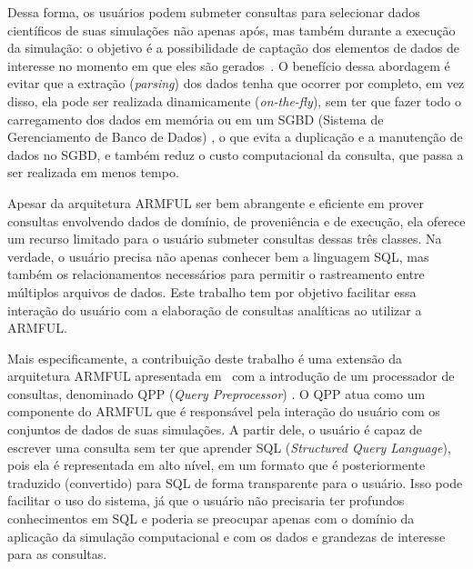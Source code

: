 Dessa forma, os usuários podem submeter consultas para selecionar dados científicos de suas simulações não apenas após, mas também durante a execução da simulação: o objetivo é a possibilidade de captação dos elementos de dados de interesse no momento em que eles são gerados~\cite{silva2015analyzing}. O benefício dessa abordagem é evitar que a extração (\textit{parsing}) dos dados tenha que ocorrer por completo, em vez disso, ela pode ser realizada dinamicamente (\textit{on-the-fly}), sem ter que fazer todo o carregamento dos dados em memória ou em um SGBD (Sistema de Gerenciamento de Banco de Dados) , o que evita a duplicação e a manutenção de dados no SGBD, e também reduz o custo computacional da consulta, que passa a ser realizada em menos tempo.

Apesar da arquitetura ARMFUL ser bem abrangente e eficiente em prover consultas envolvendo dados de domínio, de proveniência e de execução, ela oferece um recurso limitado para o usuário submeter consultas dessas três classes. Na verdade, o usuário precisa não apenas conhecer bem a linguagem SQL, mas também os relacionamentos necessários para permitir o rastreamento entre múltiplos arquivos de dados.
Este trabalho tem por objetivo facilitar essa interação do usuário com a elaboração de consultas analíticas ao utilizar a ARMFUL.

Mais especificamente, a contribuição deste trabalho é uma extensão da arquitetura ARMFUL apresentada em~\cite{silva2016situ,silva2017raw} com a introdução de um processador de consultas, denominado QPP (\textit{Query Preprocessor}) . O QPP atua como um componente do ARMFUL que é responsável pela interação do usuário com os conjuntos de dados de suas simulações. A partir dele, o usuário é capaz de escrever uma consulta sem ter que aprender  SQL (\textit{Structured Query Language}), pois ela é representada em alto nível, em um formato que é posteriormente traduzido (convertido) para SQL de forma transparente para o usuário. Isso pode facilitar o uso do sistema, já que o usuário não precisaria ter profundos conhecimentos em SQL e poderia se preocupar apenas com o domínio da aplicação da simulação computacional e com os dados e grandezas de interesse para as consultas.

